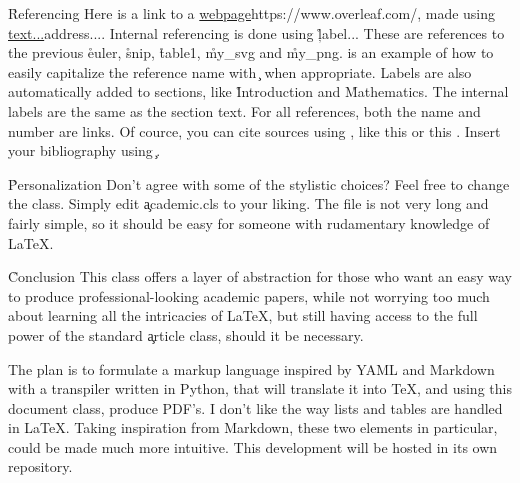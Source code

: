 \documentclass[twocolumn]{paper}
\begin{document}

\h{Referencing}
Here is a link to a \url{webpage}{https://www.overleaf.com/}, made using \c{\url{text...}{address...}}. Internal referencing is done using \c{\r{label...}} These are references to the previous \r{euler}, \r{snip}, \r{table1}, \r{my_svg} and \r{my_png}.  is an example of how to easily capitalize the reference name with \c{} when appropriate. Labels are also automatically added to sections, like \r{Introduction} and \r{Mathematics}. The internal labels are the same as the section text. For all references, both the name and number are links. Of cource, you can cite sources using \c{\cite{...}}, like this \cite{minted} or this \cite{tabularray}. Insert your bibliography using \c{}.

\h*{Personalization}
Don't agree with some of the stylistic choices? Feel free to change the class. Simply edit \c{academic.cls} to your liking. The file is not very long and fairly simple, so it should be easy for someone with rudamentary knowledge of LaTeX.

\h*{Conclusion}
This class offers a layer of abstraction for those who want an easy way to produce professional-looking academic papers, while not worrying too much about learning all the intricacies of LaTeX, but still having access to the full power of the standard \c{article} class, should it be necessary.

The plan is to formulate a markup language inspired by YAML and Markdown with a transpiler written in Python, that will translate it into TeX, and using this document class, produce PDF's. I don't like the way lists and tables are handled in LaTeX. Taking inspiration from Markdown, these two elements in particular, could be made much more intuitive. This development will be hosted in its own repository.
\end{document}
